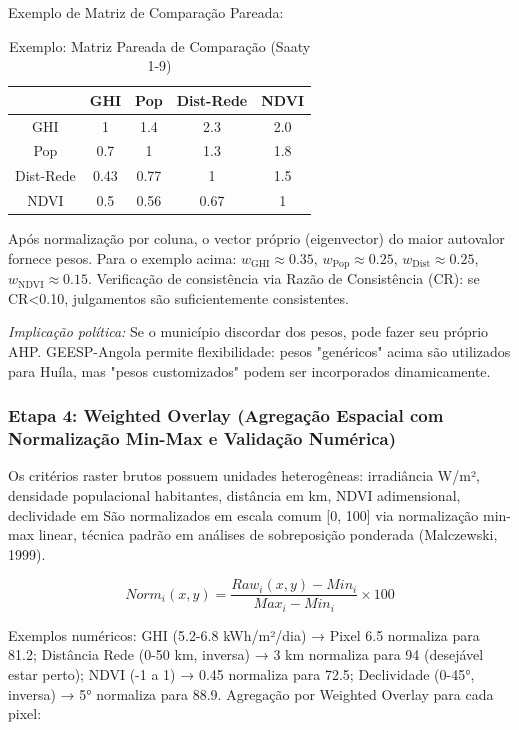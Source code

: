 \documentclass[12pt, a4paper]{article}
\begin{document}
Exemplo de Matriz de Comparação Pareada:

\begin{table}[H]
\centering
\caption{Exemplo: Matriz Pareada de Comparação (Saaty 1-9)}
\footnotesize
\begin{tabular}{|c|c|c|c|c|}
\hline
 & GHI & Pop & Dist-Rede & NDVI \\
\hline
GHI & 1 & 1.4 & 2.3 & 2.0 \\
\hline
Pop & 0.7 & 1 & 1.3 & 1.8 \\
\hline
Dist-Rede & 0.43 & 0.77 & 1 & 1.5 \\
\hline
NDVI & 0.5 & 0.56 & 0.67 & 1 \\
\hline
\end{tabular}
\end{table}

Após normalização por coluna, o vector próprio (eigenvector) do maior autovalor fornece pesos. Para o exemplo acima: $w_{\text{GHI}} \approx 0.35$, $w_{\text{Pop}} \approx 0.25$, $w_{\text{Dist}} \approx 0.25$, $w_{\text{NDVI}} \approx 0.15$. Verificação de consistência via Razão de Consistência (CR): se CR<0.10, julgamentos são suficientemente consistentes.

\textit{Implicação política:} Se o município discordar dos pesos, pode fazer seu próprio AHP.
GEESP-Angola permite flexibilidade: pesos "genéricos" acima são utilizados para Huíla, mas "pesos customizados" podem ser incorporados dinamicamente.

\subsubsection{Etapa 4: Weighted Overlay (Agregação Espacial com Normalização Min-Max e Validação Numérica)}

Os critérios raster brutos possuem unidades heterogêneas: irradiância W/m², densidade populacional habitantes, distância em km, NDVI adimensional, declividade em %
São normalizados em escala comum [0, 100] via normalização min-max linear, técnica padrão em análises de sobreposição ponderada (Malczewski, 1999).

\begin{equation}
Norm_i(x,y) = \frac{Raw_i(x,y) - Min_i}{Max_i - Min_i} \times 100
\end{equation}

Exemplos numéricos: GHI (5.2-6.8 kWh/m²/dia) → Pixel 6.5 normaliza para 81.2; Distância Rede (0-50 km, inversa) → 3 km normaliza para 94 (desejável estar perto); NDVI (-1 a 1) → 0.45 normaliza para 72.5; Declividade (0-45°, inversa) → 5° normaliza para 88.9. Agregação por Weighted Overlay para cada pixel:
\end{document}
